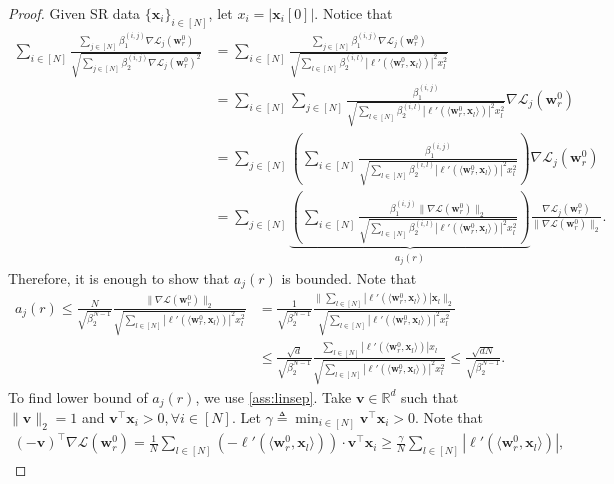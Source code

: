 \documentclass{article} %
\theoremstyle{plain}
\theoremstyle{definition}
\theoremstyle{remark}
\def\bigopen#1{\left(#1\right)}
\newcommand{\Ls}{\mathcal{L}}
\newcommand{\R}{\mathbb{R}}
\def\bx{{\mathbf x}}
\def\bw{{\mathbf w}}
\def\bv{{\mathbf v}}
\begin{document}
\begin{proof}
    Given SR data $\{\bx_i\}_{i \in [N]}$, let $x_i=|\bx_i[0]|$. Notice that
    \begin{align*}
        \sum_{i \in [N]}\frac{\sum_{j \in [N]}\beta_1^{(i, j)}\nabla\Ls_{j}(\bw_r^0)}{\sqrt{\sum_{j \in [N]}\beta_2^{(i, j)}\nabla\Ls_{j}(\bw_r^0)^2}} &= \sum_{i \in [N]}\frac{\sum_{j \in [N]}\beta_1^{(i, j)}\nabla\Ls_{j}(\bw_r^0)}{\sqrt{\sum_{l \in [N]}\beta_2^{(i, l)}|\ell'(\langle \bw_r^0, \bx_l \rangle)|^2x_l^2}} \\
        &=\sum_{i \in [N]}\sum_{j \in [N]}\frac{\beta_1^{(i, j)}}{\sqrt{\sum_{l \in [N]}\beta_2^{(i, l)}|\ell'(\langle \bw_r^0, \bx_l \rangle)|^2x_l^2}} \nabla\Ls_{j}(\bw_r^0) \\
        &=\sum_{j \in [N]} \bigopen{\sum_{i \in [N]}\frac{\beta_1^{(i, j)}}{\sqrt{\sum_{l \in [N]}\beta_2^{(i, l)}|\ell'(\langle \bw_r^0, \bx_l \rangle)|^2x_l^2}}} \nabla\Ls_{j}(\bw_r^0) \\
        &=\sum_{j \in [N]} \underbrace{\bigopen{\sum_{i \in [N]}\frac{\beta_1^{(i, j)}\|\nabla\Ls(\bw_r^0)\|_2}{\sqrt{\sum_{l \in [N]}\beta_2^{(i, l)}|\ell'(\langle \bw_r^0, \bx_l \rangle)|^2x_l^2}}}}_{a_j(r)} \frac{\nabla\Ls_{j}(\bw_r^0)}{\|\nabla \Ls(\bw_r^0)\|_2}.
    \end{align*}
    Therefore, it is enough to show that $a_j(r)$ is bounded. Note that
    \begin{align*}
        a_j(r) \leq \frac{N}{\sqrt{\beta_2^{N-1}}}\frac{\|\nabla\Ls(\bw_r^0)\|_2}{\sqrt{\sum_{l \in [N]}|\ell'(\langle \bw_r^0, \bx_l \rangle)|^2x_l^2}}
        &= \frac{1}{\sqrt{\beta_2^{N-1}}}\frac{\|\sum_{l \in [N]} |\ell'(\langle \bw_r^0, \bx_l \rangle)|\bx_l\|_2}{\sqrt{\sum_{l \in [N]}|\ell'(\langle \bw_r^0, \bx_l \rangle)|^2x_l^2}} \\
        & \leq \frac{\sqrt{d}}{\sqrt{\beta_2^{N-1}}} \frac{\sum_{l \in [N]}|\ell'(\langle \bw_r^0, \bx_l \rangle)|x_l}{\sqrt{\sum_{l \in [N]}|\ell'(\langle \bw_r^0, \bx_l \rangle)|^2x_l^2}} \leq \frac{\sqrt{dN}}{\sqrt{\beta_2^{N-1}}}.
    \end{align*}
    To find lower bound of $a_j(r)$, we use \cref{ass:linsep}. Take $\bv \in \R^d$ such that $\|\bv\|_2=1$ and $\bv^\top \bx_i > 0, \forall i \in [N]$. Let $\gamma \triangleq \min_{i \in [N]} \bv^\top \bx_i >0$. Note that
    \begin{align*}
        (-\bv)^\top \nabla \Ls(\bw_r^0) = \frac{1}{N}\sum_{l\in[N]} (-\ell'(\langle \bw_r^0, \bx_l \rangle)) \cdot \bv^\top \bx_i \geq \frac{\gamma}{N} \sum_{l\in[N]} |\ell'(\langle \bw_r^0, \bx_l \rangle)|,

\end{align*}
\end{proof}
\end{document}
